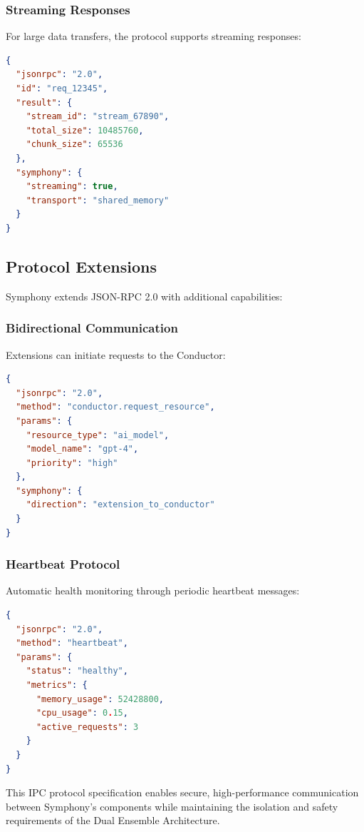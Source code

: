 \subsubsection*{Streaming Responses}

For large data transfers, the protocol supports streaming responses:

\begin{lstlisting}[language=JSON,caption={Streaming Response}]
{
  "jsonrpc": "2.0",
  "id": "req_12345",
  "result": {
    "stream_id": "stream_67890",
    "total_size": 10485760,
    "chunk_size": 65536
  },
  "symphony": {
    "streaming": true,
    "transport": "shared_memory"
  }
}
\end{lstlisting}

\subsection*{Protocol Extensions}

Symphony extends JSON-RPC 2.0 with additional capabilities:

\subsubsection*{Bidirectional Communication}

Extensions can initiate requests to the Conductor:

\begin{lstlisting}[language=JSON,caption={Extension-Initiated Request}]
{
  "jsonrpc": "2.0",
  "method": "conductor.request_resource",
  "params": {
    "resource_type": "ai_model",
    "model_name": "gpt-4",
    "priority": "high"
  },
  "symphony": {
    "direction": "extension_to_conductor"
  }
}
\end{lstlisting}

\subsubsection*{Heartbeat Protocol}

Automatic health monitoring through periodic heartbeat messages:

\begin{lstlisting}[language=JSON,caption={Heartbeat Message}]
{
  "jsonrpc": "2.0",
  "method": "heartbeat",
  "params": {
    "status": "healthy",
    "metrics": {
      "memory_usage": 52428800,
      "cpu_usage": 0.15,
      "active_requests": 3
    }
  }
}
\end{lstlisting}

This IPC protocol specification enables secure, high-performance communication between Symphony's components while maintaining the isolation and safety requirements of the Dual Ensemble Architecture.
